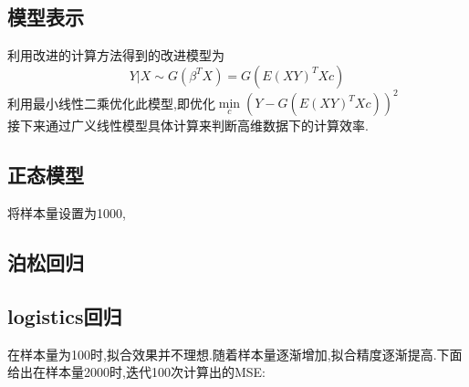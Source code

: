 \subsection{模型表示}
利用改进的计算方法得到的改进模型为
$$ Y|X \sim G(\beta^T X) = G(E(XY)^TXc)$$
利用最小线性二乘优化此模型,即优化$\min\limits_{c} (Y-G(E(XY)^TXc))^2$\\
接下来通过广义线性模型具体计算来判断高维数据下的计算效率.

\subsection{正态模型}
将样本量设置为1000,


\subsection{泊松回归}

\subsection{logistics回归}

在样本量为100时,拟合效果并不理想.随着样本量逐渐增加,拟合精度逐渐提高.下面给出在样本量2000时,迭代100次计算出的MSE: